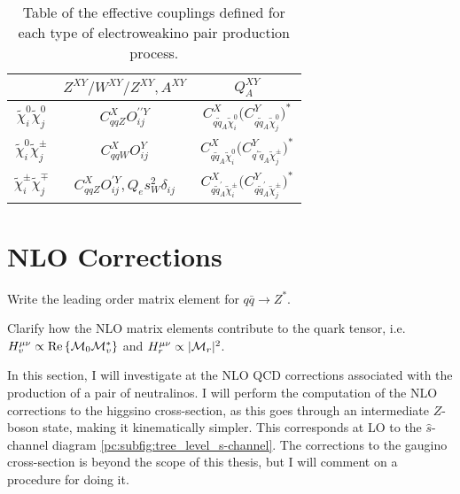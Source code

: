 \documentclass[../main.tex]{subfiles}
\begin{document}
{\renewcommand{\arraystretch}{2}
\begin{table}
  \centering
  \begin{tabular}{|c|cc|}
    \hline
                                          & \(Z^{XY} / W^{XY} / Z^{XY}, A^{XY}\)                   & \(Q_A^{XY}\)                                                                                                   \\
    \hline
    \(\tilde\chi^0_i \tilde\chi^0_j\)     & \(C_{qqZ}^X O_{ij}^{\prime\prime Y}\)                  & \(C_{q\tilde{q}_A \tilde\chi^0_i}^X \bigl(C_{q\tilde{q}_A \tilde\chi^0_j}^Y\bigr)^{\!\ast}\)                   \\
    \(\tilde\chi^0_i \tilde\chi^\pm_j\)   & \(C_{qqW}^X O_{ij}^{Y}\)                               & \(C_{q\tilde{q}_A \tilde\chi^0_i}^X \bigl(C_{q^\prime \tilde{q}_A \tilde\chi^\pm_j}^Y\bigr)^{\!\ast}\)         \\
    \(\tilde\chi^\pm_i \tilde\chi^\mp_j\) & \(C_{qqZ}^X O_{ij}^{\prime Y}, Q_e s_W^2 \delta_{ij}\) & \(C_{q\tilde{q}^\prime_A \tilde\chi^\pm_i}^X \bigl(C_{q\tilde{q}^\prime_A \tilde\chi^\pm_j}^Y\bigr)^{\!\ast}\) \\
    \hline
  \end{tabular}
  \caption{Table of the effective couplings defined for each type of electroweakino pair production process.}
  \label{pc:tab:eff_charges}
\end{table}


}



\section{NLO Corrections}
\label{pc:sec:NLO}

\begin{TODO}
  \item Write the leading order matrix element for \(q \bar{q} \to Z^\ast\).
  \item Clarify how the NLO matrix elements contribute to the quark tensor, i.e. \(H_v^{\mu\nu} \propto \operatorname{Re}\left\{\mathcal{M}_0 \mathcal{M}_v^\ast\right\}\) and \(H_r^{\mu\nu} \propto |\mathcal{M}_r|^2\).
\end{TODO}

In this section, I will investigate at the NLO QCD corrections associated with the production of a pair of neutralinos.
I will perform the computation of the NLO corrections to the higgsino cross-section, as this goes through an intermediate \(Z\)-boson state, making it kinematically simpler.
This corresponds at LO to the \(\hat{s}\)-channel diagram \cref{pc:subfig:tree_level_s-channel}.
The corrections to the gaugino cross-section is beyond the scope of this thesis, but I will comment on a procedure for doing it.
\end{document}
